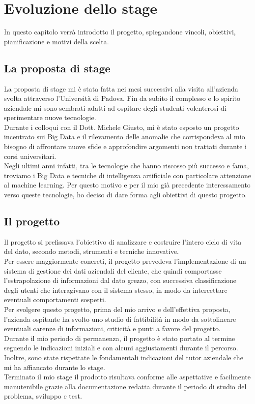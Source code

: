 
\chapter{Evoluzione dello stage}
In questo capitolo verrà introdotto il progetto, spiegandone vincoli, obiettivi, pianificazione e motivi della scelta.
\section{La proposta di stage}
La proposta di stage mi è stata fatta nei mesi successivi alla visita all'azienda svolta attraverso l'Università di Padova. Fin da subito il complesso e lo spirito aziendale mi sono sembrati adatti ad ospitare degli studenti volenterosi di sperimentare nuove tecnologie.
\\
Durante i colloqui con il Dott. Michele Giusto, mi è stato esposto un progetto incentrato sui Big Data e il rilevamento delle anomalie che corrispondeva al mio bisogno di affrontare nuove sfide e approfondire argomenti non trattati durante i corsi universitari.
\\
Negli ultimi anni infatti, tra le tecnologie che hanno riscosso più successo e fama, troviamo i Big Data e tecniche di intelligenza artificiale con particolare attenzione al machine learning.
Per questo motivo e per il mio già precedente interessamento verso queste tecnologie, ho deciso di dare forma agli obiettivi di questo progetto. 

\section{Il progetto}
Il progetto si prefissava l'obiettivo di analizzare e costruire l'intero ciclo di vita del dato, secondo metodi, strumenti e tecniche innovative.
\\
Per essere maggiormente concreti, il progetto prevedeva l'implementazione di un sistema di gestione dei dati aziendali del cliente, che quindi comportasse l'estrapolazione di informazioni dal dato grezzo, con successiva classificazione degli utenti che interagivano con il sistema stesso, in modo da intercettare eventuali comportamenti sospetti.
\\
Per svolgere questo progetto, prima del mio arrivo e dell'effettiva proposta, l'azienda ospitante ha svolto uno studio di fattibilità in modo da sottolineare eventuali carenze di informazioni, criticità e punti a favore del progetto.
\\
Durante il mio periodo di permanenza, il progetto è stato portato al termine seguendo le indicazioni iniziali e con alcuni aggiustamenti durante il percorso. Inoltre, sono state rispettate le fondamentali indicazioni del tutor aziendale che mi ha affiancato durante lo stage.
\\
Terminato il mio stage il prodotto risultava conforme alle aspettative e facilmente manutenibile grazie alla documentazione redatta durante il periodo di studio del problema, sviluppo e test.
